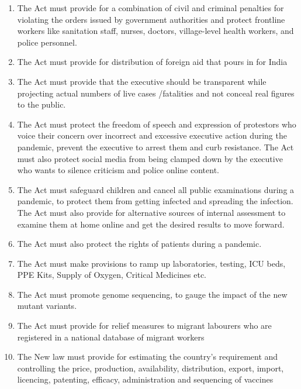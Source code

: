 \begin{multicols}{2}
\begin{enumerate}[label=$\bullet$]
\item The Act must provide for a combination of civil and criminal penalties for violating
the orders issued by government authorities and protect frontline workers like
sanitation staff, nurses, doctors, village-level health workers, and police personnel.

\item The Act must provide for distribution of foreign aid that pours in for India

\item The Act must provide that the executive should be transparent while projecting actual
numbers of live cases /fatalities and not conceal real figures to the public.

\item The Act must protect the freedom of speech and expression of protestors who voice
their concern over incorrect and excessive executive action during the pandemic,
prevent the executive to arrest them and curb resistance. The Act must also protect
social media from being clamped down by the executive who wants to silence
criticism and police online content.

\item The Act must safeguard children and cancel all public examinations during a
pandemic, to protect them from getting infected and spreading the infection. The Act
must also provide for alternative sources of internal assessment to examine them at
home online and get the desired results to move forward.

\item The Act must also protect the rights of patients during a pandemic.

\item The Act must make provisions to ramp up laboratories, testing, ICU beds, PPE Kits,
Supply of Oxygen, Critical Medicines etc.

\item The Act must promote genome sequencing, to gauge the impact of the new mutant
variants.

\item The Act must provide for relief measures to migrant labourers who are registered in a
national database of migrant workers

\item The New law must provide for estimating the country’s requirement and controlling
the price, production, availability, distribution, export, import, licencing, patenting,
efficacy, administration and sequencing of vaccines


\end{enumerate}
\end{multicols}
